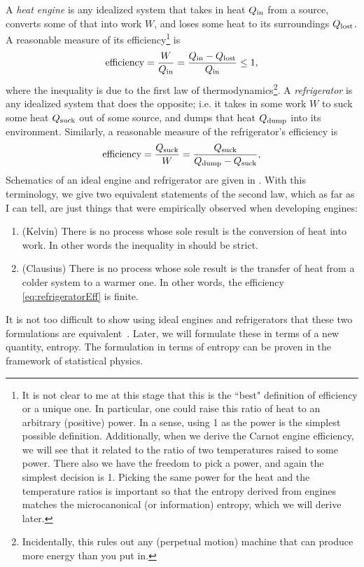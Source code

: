 A {\it heat engine} is any idealized system that takes in
heat $Q_{\text{in}}$ from a source, converts some of that into work $W$, and loses some heat to its
surroundings $Q_{\text{lost}}$. A reasonable measure of its efficiency\footnote{It is not
clear to me at this stage that this is the ``best" definition of efficiency or a
unique one. In particular, one could raise this ratio of heat to an arbitrary
(positive) power. In a sense, using 1 as the power is the simplest possible definition. 
Additionally, when we derive
the Carnot engine efficiency, we will see that it related to the ratio
of two temperatures raised to some power. There also we have the freedom to
pick a power, and again the simplest decision is 1. Picking the same power for
the heat and the temperature ratios is important so that the entropy derived from
engines matches the microcanonical (or information) entropy, which we will derive
later.} is
\begin{equation}\label{eq:engineEff}
  \text{efficiency}=\frac{W}{Q_{\text{in}}}=\frac{Q_{\text{in}}-Q_{\text{lost}}}{Q_{\text{in}}}\leq1,
\end{equation}
where the inequality is due to the first law of
thermodynamics\footnote{Incidentally, this rules out any (perpetual motion)
machine that can produce more energy than you put in.}.
A {\it refrigerator} is any idealized system that does the
opposite; i.e. it takes in some work $W$ to suck some heat $Q_{\text{suck}}$ out of
some source, and dumps that heat $Q_{\text{dump}}$ into its environment.
Similarly, a reasonable measure of the refrigerator's efficiency is
\begin{equation}\label{eq:refrigeratorEff}
  \text{efficiency}=\frac{Q_{\text{suck}}}{W}=\frac{Q_{\text{suck}}}{Q_{\text{dump}}-Q_{\text{suck}}},
\end{equation}
Schematics of an ideal engine and refrigerator are given in
.
With this terminology, we give two equivalent statements of the second law,
which as far as I can tell, are just things that were empirically observed
when developing engines:
\begin{enumerate}
  \item (Kelvin) There is no process whose sole result is the conversion of heat
        into work. In other words the inequality in 
        should be strict.
  \item (Clausius) There is no process whose sole result is the transfer of
        heat from a colder system to a warmer one. In other words, the
        efficiency \eqref{eq:refrigeratorEff} is finite.
\end{enumerate}
It is not too difficult to show using ideal engines and refrigerators
that these two formulations are equivalent~\cite{kardar_statistical_2007}.
Later, we will formulate these in terms of a new quantity, entropy. The
formulation in terms of entropy can be proven in the framework of statistical
physics.

